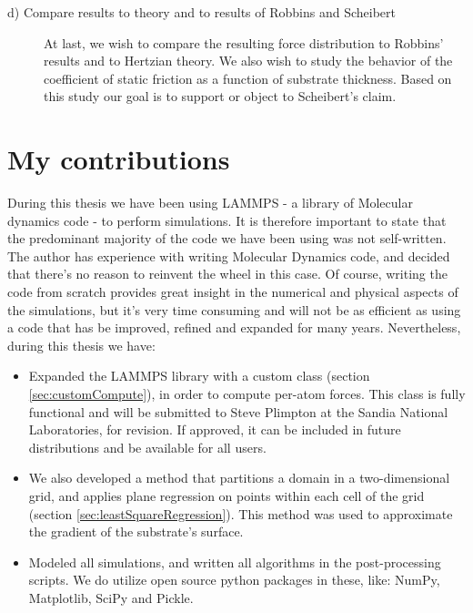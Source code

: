 \documentclass[twoside,english]{uiofysmaster}
\begin{document}
\begin{description}
	\item[d) Compare results to theory and to results of Robbins and Scheibert] \hfill %
	At last, we wish to compare the resulting force distribution to Robbins' results and to Hertzian theory. 
	We also wish to study the behavior of the coefficient of static friction as a function of substrate thickness. 
	Based on this study our goal is to support or object to Scheibert's claim. 
		
\end{description}
	
\section{My contributions}
During this thesis we have been using LAMMPS - a library of Molecular dynamics code - to perform simulations. 
It is therefore important to state that the predominant majority of the code we have been using was not self-written.
The author has experience with writing Molecular Dynamics code, and decided that there's no reason to reinvent the wheel in this case. 
Of course, writing the code from scratch provides great insight in the numerical and physical aspects of the simulations, but it's very time consuming and will not be as efficient as using a code that has be improved, refined and expanded for many years.
Nevertheless, during this thesis we have:	
\begin{itemize}
\item Expanded the LAMMPS library with a custom class (section \ref{sec:customCompute}), in order to compute per-atom forces. 
This class is fully functional and will be submitted to Steve Plimpton at the Sandia National Laboratories, for revision. 
If approved, it can be included in future distributions and be available for all users. 

\item We also developed a method that partitions a domain in a two-dimensional grid, and applies plane regression on points within each cell of the grid (section \ref{sec:leastSquareRegression}).  
This method was used to approximate the gradient of the substrate's surface.

\item Modeled all simulations, and written all algorithms in the post-processing scripts. We do utilize open source python packages in these, like: NumPy, Matplotlib, SciPy and Pickle.

\end{itemize}
\end{document}
